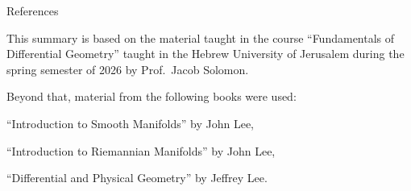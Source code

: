 {\setboxshadow
\contentbox

    \centerline{References}

    This summary is based on the material taught in the course ``Fundamentals of Differential Geometry'' taught in the Hebrew University of Jerusalem
    during the spring semester of 2026 by Prof.\ Jacob Solomon.

    Beyond that, material from the following books were used:
    \benum
        \item ``Introduction to Smooth Manifolds'' by John Lee,
        \item ``Introduction to Riemannian Manifolds'' by John Lee,
        \item ``Differential and Physical Geometry'' by Jeffrey Lee.
    \eenum

\eppbox}

\vfill
\fi

\bye

